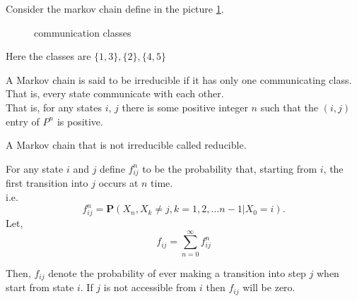 \begin{example}[]
    Consider the markov chain define in the picture \cref{example of communication}.
\begin{figure}[h]
    \centering
    \caption{communication classes}
    \label{example of communication}
\end{figure}

Here the classes are $\{ 1,3 \}, \{2\}, \{4,5\}$
\end{example}

\begin{definition}
    A Markov chain is said to be irreducible if it has only one communicating class. That is, every state communicate with each other.\\ 
    That is, for any states $i$, $j$ there is some positive integer $n$ such that the $(i, j)$ entry of $ P^{n} $ is positive.
\end{definition}

A Markov chain that is not irreducible called reducible.

For any state $ i $ and $ j $ define $ f^{n}_{ij} $ to be the probability that, starting from $ i $, the first transition into $ j  $
occurs at $ n $ time. \\ 
i.e. 
\[
    f^{n}_{ij} = \mathbf{P}(X_{n},X_{k}\neq j, k=1,2,\ldots n-1|X_{0}=i).
\]
Let,
\[
    f_{ij}=\sum_{n=0}^{\infty} f^{n}_{ij}
\]

Then, $ f_{ij} $ denote the probability of ever making a transition into step $ j $ when start from state $ i $. 
If $ j $ is not accessible from $ i $ then $ f_{ij} $ will be zero.

